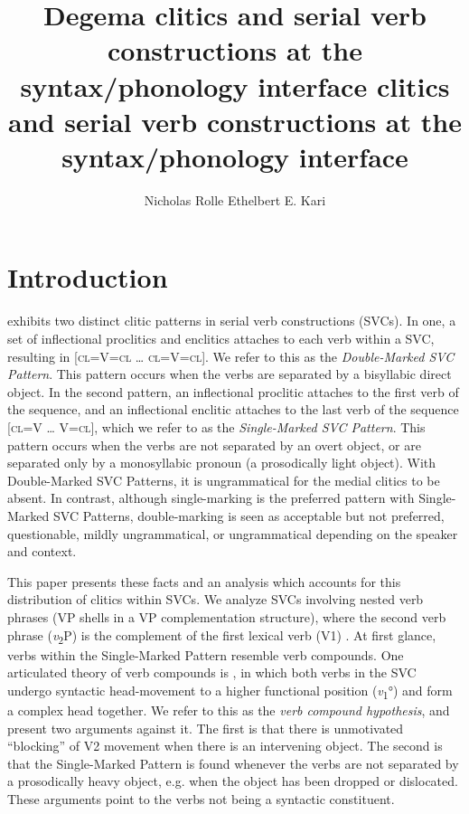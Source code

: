 \documentclass[output=paper]{langsci/langscibook}
\title{Degema clitics and serial verb constructions at the syntax/phonology interface}
\author{%
 Nicholas Rolle\affiliation{University of California, Berkeley}\lastand 
 Ethelbert E. Kari \affiliation{University of Botswana / University of Port Harcourt}
}
\begin{document}
\title{ clitics and serial verb constructions at the syntax/phonology interface}
 



 


\section{Introduction}

 exhibits two distinct clitic patterns in serial verb constructions (SVCs). In one, a set of inflectional proclitics and enclitics attaches to each verb within a SVC, resulting in [\textsc{cl=}V\textsc{=cl} … \textsc{cl=}V\textsc{=cl}]. We refer to this as the \textit{Double-Marked SVC Pattern}. This pattern occurs when the verbs are separated by a bisyllabic direct object. In the second pattern, an inflectional proclitic attaches to the first verb of the sequence, and an inflectional enclitic attaches to the last verb of the sequence [\textsc{cl=}V … V\textsc{=cl}], which we refer to as the \textit{Single-Marked SVC Pattern}. This pattern occurs when the verbs are not separated by an overt object, or are separated only by a monosyllabic pronoun (a prosodically light object). With Double-Marked SVC Patterns, it is ungrammatical for the medial clitics to be absent. In contrast, although single-marking is the preferred pattern with Single-Marked SVC Patterns, double-marking is seen as acceptable but not preferred, questionable, mildly ungrammatical, or ungrammatical depending on the speaker and context. 

This paper presents these facts and an analysis which accounts for this distribution of clitics within SVCs. We analyze  SVCs involving nested verb phrases (VP shells in a VP complementation structure), where the second verb phrase (\textit{v}\textsubscript{2}P) is the complement of the first lexical verb (V1) \citep{Collins1997,Collins2002}. At first glance, verbs within the Single-Marked Pattern resemble verb compounds. One articulated theory of verb compounds is \citet{Collins2002}, in which both verbs in the SVC undergo syntactic head-movement to a higher functional position (\textit{v}\textsubscript{1}°) and form a complex head together. We refer to this as the \textit{verb compound hypothesis}, and present two arguments against it. The first is that there is unmotivated “blocking” of V2 movement when there is an intervening object. The second is that the Single-Marked Pattern is found whenever the verbs are not separated by a prosodically heavy object, e.g. when the object has been dropped or dislocated. These arguments point to the verbs not being a syntactic constituent. 
\end{document}
